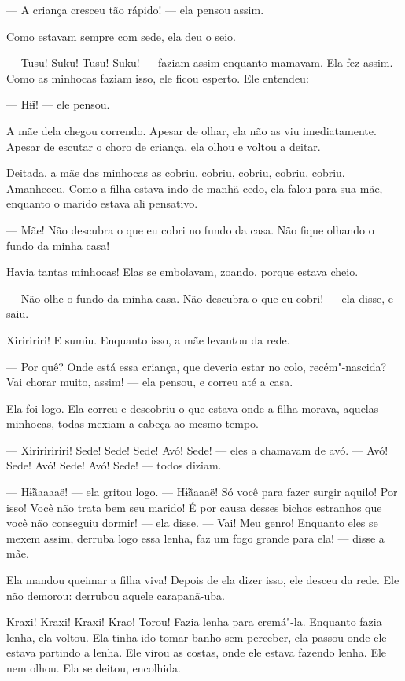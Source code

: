--- A criança cresceu tão rápido! --- ela pensou assim. 

Como estavam sempre com sede, ela deu o seio. 

--- Tusu! Suku! Tusu! Suku! --- faziam assim enquanto mamavam. Ela
fez assim. Como as minhocas faziam isso, ele ficou esperto. Ele
entendeu: 

--- Hɨ̃ɨ! --- ele pensou. 

A mãe dela chegou correndo. Apesar de olhar, ela não as viu
imediatamente. Apesar de escutar o choro de criança, ela olhou e voltou
a deitar. 

Deitada, a mãe das minhocas as cobriu, cobriu, cobriu, cobriu, cobriu.
Amanheceu. Como a filha estava indo de manhã cedo, ela falou para sua
mãe, enquanto o marido estava ali pensativo.

--- Mãe! Não descubra o que eu cobri no fundo da casa. Não fique olhando
o fundo da minha casa! 

Havia tantas minhocas! Elas se embolavam, zoando, porque estava cheio. 

--- Não olhe o fundo da minha casa. Não descubra o que eu cobri! --- ela
disse, e saiu. 

Xiriririri! E sumiu. Enquanto isso, a mãe levantou da rede. 

--- Por quê? Onde está essa criança, que deveria estar no colo,
recém"-nascida? Vai chorar muito, assim! --- ela pensou, e correu até a
casa. 

Ela foi logo. Ela correu e descobriu o que estava onde a filha morava,
aquelas minhocas, todas mexiam a cabeça ao mesmo tempo. 

--- Xiririririri! Sede! Sede! Sede! Avó! Sede! --- eles a chamavam de
avó. --- Avó! Sede! Avó! Sede! Avó! Sede! --- todos diziam. 

--- Hɨ̃ãaaaaë! --- ela gritou logo. --- Hɨ̃ãaaaë! Só você para fazer surgir
aquilo! Por isso! Você não trata bem seu marido! É por causa desses
bichos estranhos que você não conseguiu dormir! --- ela disse. --- Vai! Meu
genro! Enquanto eles se mexem assim, derruba logo essa lenha, faz um fogo
grande para ela! --- disse a mãe. 

Ela mandou queimar a filha viva! Depois de ela dizer isso, ele desceu da
rede. Ele não demorou: derrubou aquele carapanã-uba.

Kraxi! Kraxi! Kraxi! Krao! Torou! Fazia lenha para cremá"-la. Enquanto
fazia lenha, ela voltou. Ela tinha ido tomar banho sem perceber, ela passou
onde ele estava partindo a lenha. Ele virou as costas, onde ele estava fazendo
lenha. Ele nem olhou. Ela se deitou, encolhida. 

